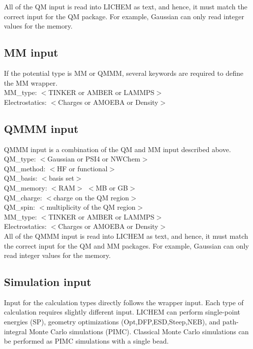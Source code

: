 \documentclass[12pt]{report}
\begin{document}
All of the QM input is read into LICHEM as text, and hence, it must match the
correct input for the QM package.
For example, Gaussian can only read integer values for the memory.

\subsection{MM input}

If the potential type is MM or QMMM, several keywords are required to define
the MM wrapper. \\

MM\_type: $<$TINKER or AMBER or LAMMPS$>$ \\
Electrostatics: $<$Charges or AMOEBA or Density$>$ \\

\subsection{QMMM input}

QMMM input is a combination of the QM and MM input described above. \\

QM\_type: $<$Gaussian or PSI4 or NWChem$>$ \\
QM\_method: $<$HF or functional$>$ \\
QM\_basis: $<$basis set$>$ \\
QM\_memory: $<$RAM$>$ $<$MB or GB$>$ \\
QM\_charge: $<$charge on the QM region$>$ \\
QM\_spin: $<$multiplicity of the QM region$>$ \\
MM\_type: $<$TINKER or AMBER or LAMMPS$>$ \\
Electrostatics: $<$Charges or AMOEBA or Density$>$ \\

All of the QMMM input is read into LICHEM as text, and hence, it must match the
correct input for the QM and MM packages.
For example, Gaussian can only read integer values for the memory.

\subsection{Simulation input}

Input for the calculation types directly follows the wrapper input.
Each type of calculation requires slightly different input.
LICHEM can perform single-point energies (SP), geometry optimizations
(Opt,DFP,ESD,Steep,NEB), and path-integral Monte Carlo simulations (PIMC).
Classical Monte Carlo simulations can be performed as PIMC simulations with a
single bead. \\
\end{document}
